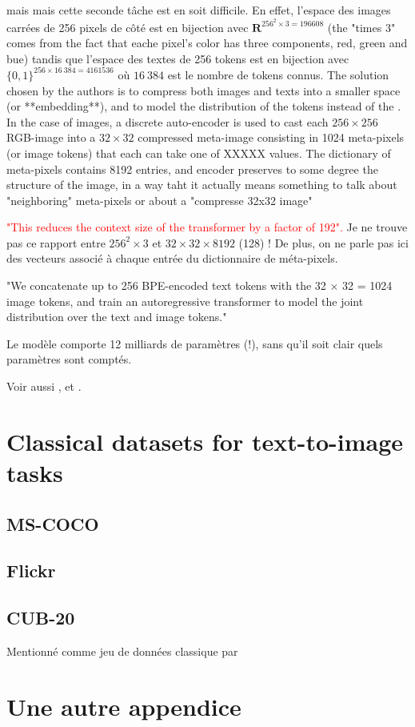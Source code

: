 \documentclass{article}
\begin{document}
\begin{appendix}
mais mais cette seconde tâche est en soit difficile. En effet, l'espace des images carrées de 256 pixels de côté est en bijection avec $\mathbf{R}^{256^2\times 3 = 196608}$ (the "times 3" comes from the fact that eache pixel's color has three components, red, green and bue) tandis que l'espace des textes de 256 tokens est en bijection avec $\{0,1\}^{256\times16~384 = 4161536}$ où $16~384$ est le nombre de tokens connus.
The solution chosen by the authors is to compress both images and texts into a smaller space (or **embedding**), and to model the distribution of the tokens instead of the .
In the case of images, a discrete auto-encoder is used to cast each $256 \times 256$ RGB-image into a $32 \times 32$ compressed meta-image consisting in 1024 meta-pixels (or image tokens) that each can take one of XXXXX values.
The dictionary of meta-pixels contains 8192 entries, and encoder preserves to some degree the structure of the image, in a way taht it actually means something to talk about "neighboring" meta-pixels or about a "compresse 32x32 image"

\textcolor{red}{"This reduces the context size of the transformer by a factor of 192".} Je ne trouve pas ce rapport entre $256^2\times 3$ et $32\times32\times8192$ (128) ! De plus, on ne parle pas ici des vecteurs associé à chaque entrée du dictionnaire de méta-pixels.

"We concatenate up to 256 BPE-encoded text tokens with the 32 × 32 = 1024 image tokens, and train an autoregressive transformer to model the joint distribution over the text and image tokens."

Le modèle comporte 12 milliards de paramètres (!), sans qu'il soit clair quels paramètres sont comptés.

Voir aussi \cite{neural-discrete}, \cite{high-fi-with-vqvae2} et \cite{subword-units}.

\section{Classical datasets for text-to-image tasks}

\subsection{MS-COCO}

\subsection{Flickr}

\subsection{CUB-20}

Mentionné comme jeu de données classique par \cite{zeroshot}

\section{Une autre appendice}

\end{appendix}
\end{document}
